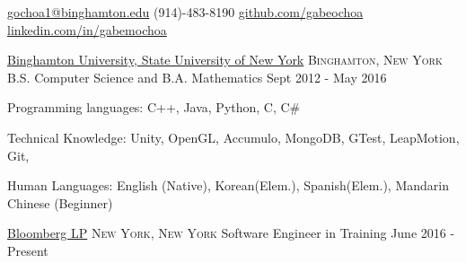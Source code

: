 \documentclass[11pt]{article}
\begin{document}


\nobreakvspace{0.3em}  %

\href{mailto:gochoa1@binghamton.edu}{gochoa1@binghamton.edu}\sbull
(914)-483-8190\sbull
\href{https://github.com/gabeochoa}{github.com/gabeochoa}\sbull
\href{https://www.linkedin.com/in/gabemochoa}{linkedin.com/in/gabemochoa}


\spacedhrule{0.1em}{0.5em}  %

\headedsection
{\href{http://www.binghamton.edu/index.php}{Binghamton University, State University of New York}}
{\textsc{Binghamton, New York}} {
    \inlineheadrightdate
    {B.S. Computer Science and B.A. Mathematics}
    {Sept 2012 - May 2016}
}


\spacedhrule{0.1em}{0.5em}  %

\inlineheadsection  %
{Programming languages:}
{ C++, Java,  Python, C, C\# }

\inlineheadsection
{Technical Knowledge:}
{ Unity, OpenGL, Accumulo, MongoDB, GTest, LeapMotion, Git, \latex }

\inlineheadsection
{Human Languages:}
{English (Native), Korean(Elem.), Spanish(Elem.), Mandarin Chinese (Beginner)}


\spacedhrule{0.1em}{0.5em}  %

\headedsection  %
{\href{http://www.bloomberg.com/}{Bloomberg LP}}
{\textsc{New York, New York}} {
    \headedsubsection
    {Software Engineer in Training}
    {June 2016 - Present}
    {
    }
}
\end{document}
